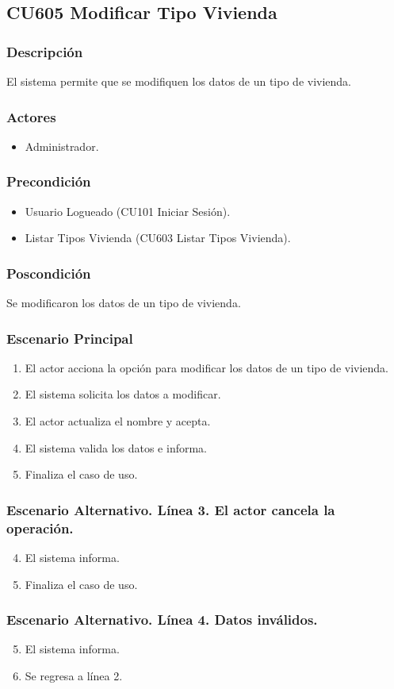 \subsection{CU605 Modificar Tipo Vivienda}
\subsubsection{Descripci\'{o}n}
El sistema permite que se modifiquen los datos de un tipo de vivienda.
\subsubsection{Actores}
\begin{itemize}
\item Administrador.
\end{itemize}
\subsubsection{Precondici\'{o}n}
\begin{itemize}
\item Usuario Logueado (CU101 Iniciar Sesi\'{o}n).
\item Listar Tipos Vivienda (CU603 Listar Tipos Vivienda).
\end{itemize}
\subsubsection{Poscondici\'{o}n}
Se modificaron los datos de un tipo de vivienda.
\subsubsection{Escenario Principal}
\begin{enumerate}
\item El actor acciona la opci\'{o}n para modificar los datos de un tipo de vivienda.
\item El sistema solicita los datos a modificar.
\item El actor actualiza el nombre y acepta.
\item El sistema valida los datos e informa.
\item Finaliza el caso de uso.
\end{enumerate}
\subsubsection{Escenario Alternativo. L\'{i}nea 3. El actor cancela la operaci\'{o}n.}
\begin{enumerate}
\setcounter{enumi}{3}
\item El sistema informa.
\item Finaliza el caso de uso.
\end{enumerate}
\subsubsection{Escenario Alternativo. L\'{i}nea 4. Datos inv\'{a}lidos.}
\begin{enumerate}
\setcounter{enumi}{4}
\item El sistema informa.
\item Se regresa a l\'{i}nea 2.
\end{enumerate}
